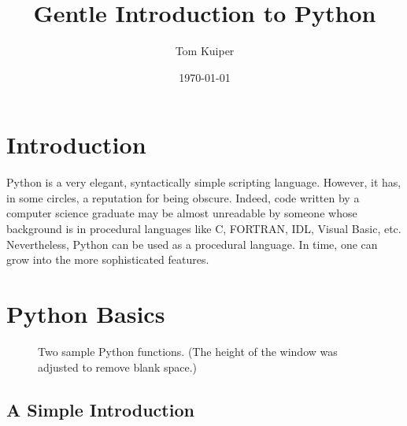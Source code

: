 \documentclass{article}
\begin{document}
\title{Gentle Introduction to Python}
\author{Tom Kuiper}
\date{\today}

\maketitle

\section{Introduction}

Python is a  very elegant, syntactically simple scripting language.  However,
it has, in some circles, a reputation for being obscure.  Indeed, code written
by a computer science graduate may be almost unreadable by someone whose
background is in procedural languages like C, FORTRAN, IDL, Visual Basic, etc.
Nevertheless, Python can be used as a procedural language.  In time, one can
grow into the more sophisticated features.

\section{Python Basics}

\begin{figure}[h!tb]
\begin{center}
\caption{\label{fig:ex1_module}Two sample Python functions. (The height of
the window was adjusted to remove blank space.)}
\end{center}
\end{figure}

\subsection{A Simple Introduction}
\end{document}
